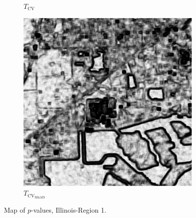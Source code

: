 \begin{figure}[H]
\begin{subfigure}[b]{0.3\textwidth}
    \caption{$T_\text{CV}$}
    \label{fig:lake_pvalue-2}
  \end{subfigure}
  \hfill
  \begin{subfigure}[b]{0.3\textwidth}
    \centering
    \includegraphics[width=\textwidth]{../../Figures/PNG/mnad_p_values_lake_512}
     \caption{$T_{\text{CV}_{\text{MnAD}}}$}
    \label{fig:lake_pvalue-3}
  \end{subfigure}
  \caption{Map of $p$-values, Illinois-Region 1. }
  \label{fig:lake_pvalue}
\end{figure}



